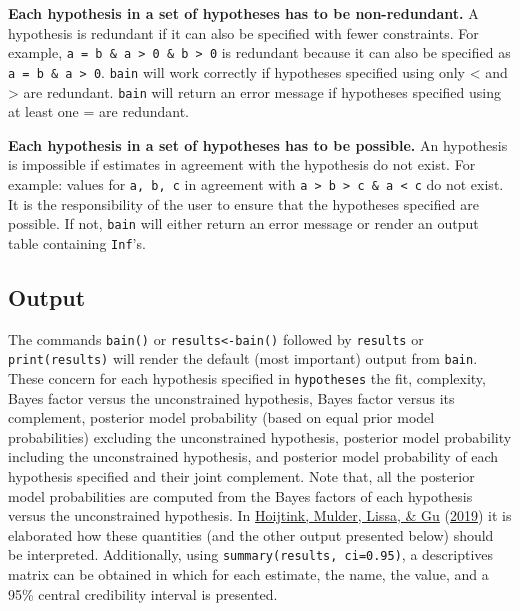 \documentclass[
]{book}
\begin{document}
\textbf{Each hypothesis in a set of hypotheses has to be non-redundant.} A
hypothesis is redundant if it can also be specified with fewer constraints.
For example, \texttt{a\ =\ b\ \&\ a\ \textgreater{}\ 0\ \&\ b\ \textgreater{}\ 0} is redundant because it can also be
specified as \texttt{a\ =\ b\ \&\ a\ \textgreater{}\ 0}. \texttt{bain} will work correctly if
hypotheses specified using only \textless{} and \textgreater{} are redundant. \texttt{bain} will
return an error message if hypotheses specified using at least one = are
redundant.

\textbf{Each hypothesis in a set of hypotheses has to be possible.} An
hypothesis is impossible if estimates in agreement with the hypothesis do not
exist. For example: values for \texttt{a,\ b,\ c} in agreement with \texttt{a\ \textgreater{}\ b\ \textgreater{}\ c\ \&\ a\ \textless{}\ c} do not exist. It is the responsibility of the user to ensure that the
hypotheses specified are possible. If not, \texttt{bain} will either return an
error message or render an output table containing \texttt{Inf}'s.

\hypertarget{output}{%
\subsection{Output}\label{output}}

The commands \texttt{bain()} or \texttt{results\textless{}-bain()} followed by
\texttt{results} or \texttt{print(results)} will render the default (most
important) output from \texttt{bain}. These concern for each hypothesis
specified in \texttt{hypotheses} the fit, complexity, Bayes factor versus
the unconstrained hypothesis, Bayes factor versus its
complement, posterior model probability (based on equal prior model
probabilities) excluding the unconstrained hypothesis, posterior model
probability including the unconstrained hypothesis, and posterior model
probability of each hypothesis specified and their joint complement.
Note that, all the posterior model probabilities are computed from
the Bayes factors of each hypothesis versus the unconstrained hypothesis.
In \protect\hyperlink{ref-hoijtink2019tutorial}{Hoijtink, Mulder, Lissa, \& Gu} (\protect\hyperlink{ref-hoijtink2019tutorial}{2019}) it is elaborated how these quantities
(and the other
output presented below) should be interpreted. Additionally, using
\texttt{summary(results,\ ci=0.95)}, a descriptives matrix can be obtained
in which for each estimate, the name, the value, and a 95\% central
credibility interval is presented.
\end{document}
